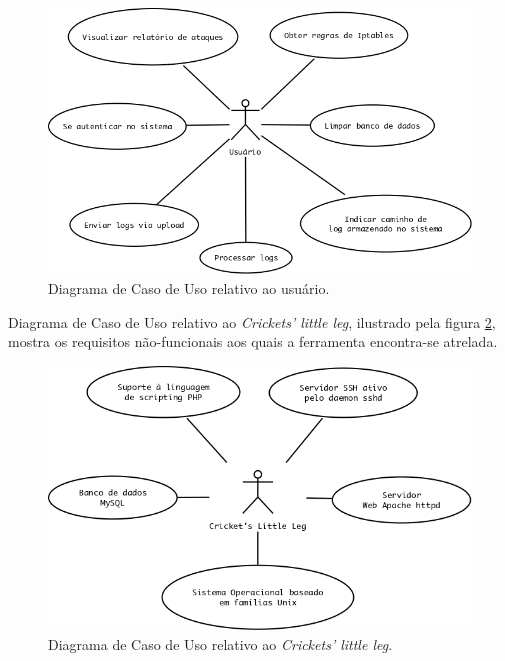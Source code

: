 \begin{figure}[ht]
    \begin{center}
        \includegraphics[scale=0.4]{./figuras/uc-usuario.png}

        \caption{\label{figura:uc-usuario}Diagrama de Caso de Uso relativo ao usuário.}
    \end{center}
\end{figure}

\clearpage
Diagrama de Caso de Uso relativo ao \textit{Crickets' little leg}, ilustrado pela figura \ref{figura:uc-ccl}, mostra os requisitos não-funcionais aos quais a ferramenta encontra-se atrelada.

\begin{figure}[ht]
    \begin{center}
        \includegraphics[scale=0.4]{./figuras/uc-ccl.png}

        \caption{\label{figura:uc-ccl}Diagrama de Caso de Uso relativo ao \textit{Crickets' little leg}.}
    \end{center}
\end{figure}

